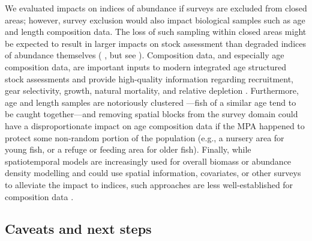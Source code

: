 \documentclass[12pt]{article}
\newcommand{\R}[1]{\label{#1}\linelabel{#1}}
\begin{document}
\begin{spacing}{1.4}
We evaluated impacts on indices of abundance if surveys are excluded from closed areas; however, survey exclusion would also impact biological samples such as \R{E4}age and length composition data.
The loss of such sampling within closed areas might be expected to result in larger impacts on stock assessment than degraded indices of abundance themselves (\citeauthor{yin2004} \citeyear{yin2004}, but see \citeauthor{chen2003} \citeyear{chen2003}).
Composition data, and especially age composition data, are important inputs to modern integrated age structured stock assessments and provide high-quality information regarding recruitment, gear selectivity, growth, natural mortality, and relative depletion \citep{magnusson2007, ono2015}.
Furthermore, age and length samples are notoriously clustered \citep{hilbornwalters1992, francis2011}---fish of a similar age tend to be caught together---and removing spatial blocks from the survey domain could have a disproportionate impact on age composition data if the MPA happened to protect some non-random portion of the population (e.g., a nursery area for young fish, or a refuge or feeding area for older fish).
Finally, while spatiotemporal models are increasingly used for overall biomass or abundance density modelling and could use spatial information, covariates, or other surveys to alleviate the impact to indices, such approaches are less well-established for composition data \citep[but see][]{thorsonhaltuch2018}.

\subsection*{Caveats and next steps}


\end{spacing}
\end{document}
